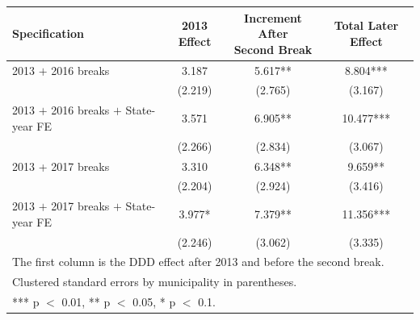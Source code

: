 {\fontsize{10}{12}\selectfont
\begin{tabular}{lccc}
\toprule
Specification & 2013 Effect & \makecell{Increment After \\ Second Break} & Total Later Effect \\
\midrule
2013 $+$ 2016 breaks & 3.187 & 5.617** & 8.804*** \\
 & (2.219) & (2.765) & (3.167) \\
2013 $+$ 2016 breaks $+$ State-year FE & 3.571 & 6.905** & 10.477*** \\
 & (2.266) & (2.834) & (3.067) \\
2013 + 2017 breaks & 3.310 & 6.348** & 9.659** \\
 & (2.204) & (2.924) & (3.416) \\
2013 $+$ 2017 breaks $+$ State-year FE & 3.977* & 7.379** & 11.356*** \\
 & (2.246) & (3.062) & (3.335) \\
\midrule
\multicolumn{4}{l}{ The first column is the DDD effect after 2013 and before the second break.} \\
\multicolumn{4}{l}{ Clustered standard errors by municipality in parentheses.} \\
\multicolumn{4}{l}{ *** p $<$ 0.01, ** p $<$ 0.05, * p $<$ 0.1.} \\
\bottomrule
\end{tabular}
}
